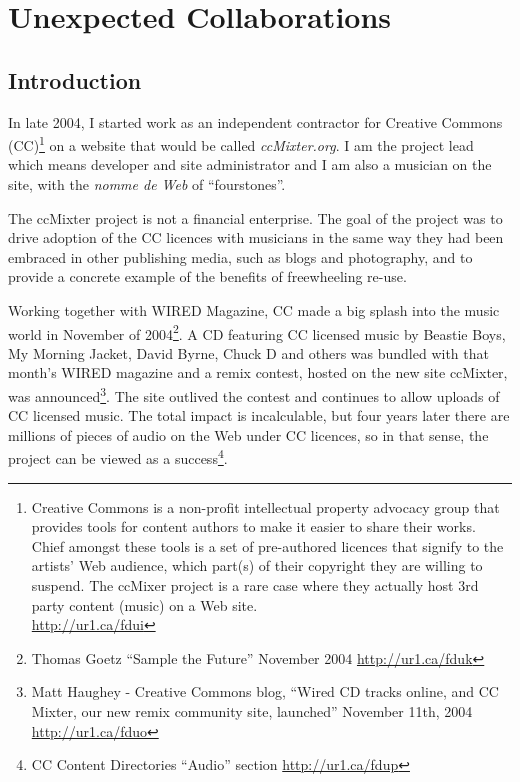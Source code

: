 \begin{savequote}
\end{savequote}
\chapter{Unexpected Collaborations}
\label{c:unexpected_collaborations}


\section{Introduction}
\label{s:unexpected_collaborations:introduction}

In late 2004, I started work as an independent contractor for Creative Commons
(CC)\footnote{Creative Commons is a non-prof\hbox{}it intellectual property advocacy
group that provides tools for content authors to make it easier to share their
works. Chief amongst these tools is a set of pre-authored licences that signify
to the artists' Web audience, which part(s) of their copyright they are willing
to suspend. The ccMixer project is a rare case where they actually host 3rd
party content (music) on a Web site.\\ \url{http://ur1.ca/fdui}} on a
website that would be called \textit{ccMixter.org}. I am the project lead which
means developer and site administrator and I am also a musician on the site,
with the \textit{nomme de Web} of ``fourstones''. 

The ccMixter project is not a f\hbox{}inancial enterprise. The goal of the project was
to drive adoption of the CC licences with musicians in the same way they had
been embraced in other publishing media, such as blogs and photography, and to
provide a concrete example of the benef\hbox{}its of freewheeling re-use.

Working together with WIRED Magazine, CC made a big splash into the music world
in November of 2004\footnote{Thomas Goetz ``Sample the Future'' November 2004
\url{http://ur1.ca/fduk}}. A CD featuring CC licensed music by Beastie Boys, My
Morning Jacket, David Byrne, Chuck D and others was bundled with that month's
WIRED magazine and a remix contest, hosted on the new site ccMixter, was
announced\footnote{Matt Haughey - Creative Commons blog, ``Wired CD tracks
online, and CC Mixter, our new remix community site, launched'' November 11th, 2004
\url{http://ur1.ca/fduo}}. The site outlived the contest and continues to allow uploads of CC
licensed music. The total impact is incalculable, but four years later there are
millions of pieces of audio on the Web under CC licences, so in that sense, the
project can be viewed as a success\footnote{CC Content Directories ``Audio'' section
\url{http://ur1.ca/fdup}}.



